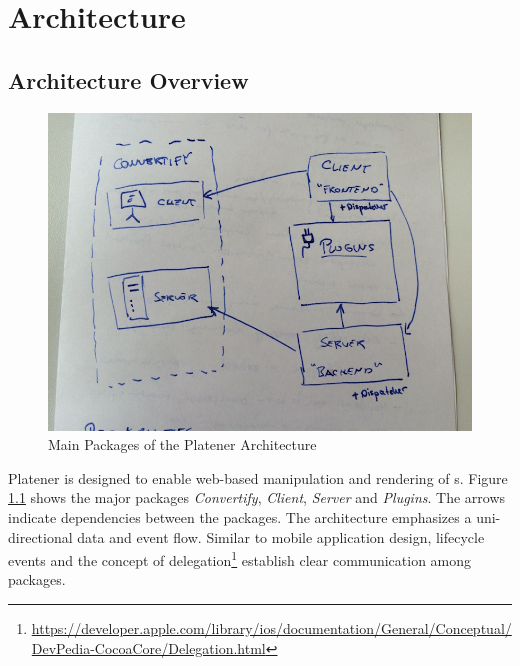 \documentclass[../ClassicThesis.tex]{subfiles}
\begin{document}
\chapter{Architecture}\label{ch:architecture}

\newcommand\myNotes[1]{\textcolor{red}{#1}}

\section{Architecture Overview}

\begin{figure}
  \includegraphics[width=1\columnwidth]{Images/03-architecture_overview_current.JPG}
  \caption{Main Packages of the Platener Architecture}
  \label{fig:architectureOverviewCurrent}
\end{figure}

Platener is designed to enable web-based manipulation and rendering of
{\threedmodel}s. Figure \ref{fig:architectureOverviewCurrent} shows the major
packages \emph{Convertify}, \emph{Client}, \emph{Server} and \emph{Plugins}. The
arrows indicate dependencies between the packages. The architecture emphasizes a
uni-directional data and event flow. Similar to mobile application design,
lifecycle events and the concept of
delegation\footnote{\url{https://developer.apple.com/library/ios/documentation/General/Conceptual/DevPedia-CocoaCore/Delegation.html}}
establish clear communication among packages.
\end{document}
